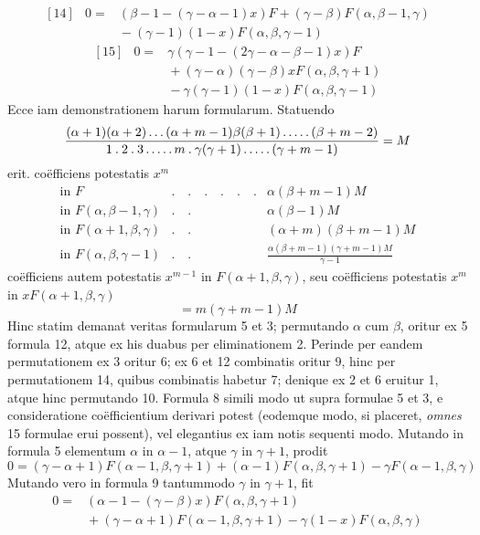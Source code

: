 \[
\begin{array}{rcl}
{[14]}&0=&(\beta-1-(\gamma-\alpha-1)x)F+(\gamma-\beta)F(\alpha,\beta-1,\gamma)\\
&&{}-(\gamma-1)(1-x)F(\alpha,\beta,\gamma-1)
\end{array}
\]
\[
\begin{array}{rcl}
{[15]}&0=&\gamma(\gamma-1-(2\gamma-\alpha-\beta-1)x)F\\
&&{}+(\gamma-\alpha)(\gamma-\beta)xF(\alpha,\beta,\gamma+1)\\
&&{}-\gamma(\gamma-1)(1-x)F(\alpha,\beta,\gamma-1)
\end{array}
\]
Ecce iam demonstrationem harum formularum. Statuendo
\[
\frac{(\alpha+1)(\alpha+2)\mathinner{.\,.\,.}(\alpha+m-1)\beta(\beta+1)\mathinner{.\,.\,.\,.\,.}(\beta+m-2)}{1\mathbin{.}2\mathbin{.}3\mathinner{.\,.\,.\,.\,.}m\mathbin{.}\gamma(\gamma+1)\mathinner{.\,.\,.\,.\,.}(\gamma+m-1)}=M
\]
erit. co\"efficiens potestatis $x^m$
\[
\begin{array}{lll}
\mbox{in }F&.\quad.\quad.\quad.\quad.\quad.&\alpha(\beta+m-1)M\\
\mbox{in }F(\alpha,\beta-1,\gamma)&.\quad.&\alpha(\beta-1)M\\
\mbox{in }F(\alpha+1,\beta,\gamma)&.\quad.&(\alpha+m)(\beta+m-1)M\\
\mbox{in }F(\alpha,\beta,\gamma-1)&.\quad.&\frac{\alpha(\beta+m-1)(\gamma+m-1)M}{\gamma-1}
\end{array}
\]
co\"efficiens autem potestatis $x^{m-1}$ in $F(\alpha+1,\beta,\gamma)$, seu co\"efficiens potestatis $x^m$
in $xF(\alpha+1,\beta,\gamma)$
\[
=m(\gamma+m-1)M
\]
Hinc statim demanat veritas formularum 5 et 3; permutando $\alpha$ cum $\beta$, oritur
ex 5 formula 12, atque ex his duabus per eliminationem 2. Perinde per eandem permutationem ex 3 oritur 6; ex 6 et 12 combinatis oritur 9, hinc per
permutationem 14, quibus combinatis habetur 7; denique ex 2 et 6 eruitur 1,
atque hinc permutando 10. Formula 8 simili modo ut supra formulae 5 et 3,
e consideratione co\"efficientium derivari potest (eodemque modo, si placeret, \textit{omnes}
15 formulae erui possent), vel elegantius ex iam notis sequenti modo. Mutando
in formula 5 elementum $\alpha$ in $\alpha-1$, atque $\gamma$ in $\gamma+1$, prodit
\[
0=(\gamma-\alpha+1)F(\alpha-1,\beta,\gamma+1)+(\alpha-1)F(\alpha,\beta,\gamma+1)-\gamma F(\alpha-1,\beta,\gamma)
\]
Mutando vero in formula 9 tantummodo $\gamma$ in $\gamma+1$, fit
\[
\begin{aligned}0={}&(\alpha-1-(\gamma-\beta)x)F(\alpha,\beta,\gamma+1)\\
&{}+(\gamma-\alpha+1)F(\alpha-1,\beta,\gamma+1)-\gamma(1-x)F(\alpha,\beta,\gamma)\end{aligned}
\]
